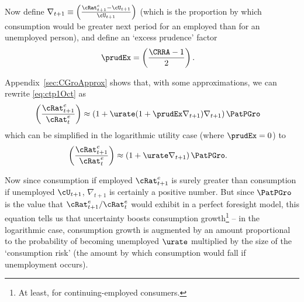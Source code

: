 \documentclass{\handout}
\begin{document}


Now define $\nabla _{t+1} \equiv
\left(\frac{{\cRat}^{e}_{t+1}-\cU_{t+1}}{\cU_{t+1}}\right)$ (which is
the proportion by which consumption would
be greater next period for an employed than for an 
unemployed person), and define an `excess prudence' factor
\begin{equation}\begin{gathered}\begin{aligned}
  \prudEx & =  \left(\frac{\CRRA-1}{2}\right).
\end{aligned}\end{gathered}\end{equation}

Appendix~\ref{sec:CGroApprox} shows that, with some approximations, we can rewrite \eqref{eq:ctp1Oct} as
\begin{equation}\begin{gathered}\begin{aligned}
         \left(\frac{{\cRat}^{e}_{t+1}}{{\cRat}^{e}_{t}}\right) & \approx  \left(1+ \urate (1+\prudEx\nabla _{t+1})\nabla _{t+1}\right) {\PatPGro}
         \label{eq:cedelapprox}
\end{aligned}\end{gathered}\end{equation}
which can be simplified in the logarithmic utility case (where $\prudEx = 0$) to
\begin{equation}\begin{gathered}\begin{aligned}
         \left(\frac{{\cRat}^{e}_{t+1}}{{\cRat}^{e}_{t}}\right) & \approx  \left(1+ \urate \nabla _{t+1}\right) {\PatPGro} \label{eq:cedelapproxLog}. 
\end{aligned}\end{gathered}\end{equation}

Now since consumption if employed ${\cRat}^{e}_{t+1}$ is surely greater than consumption if unemployed $\cU_{t+1}$, $\nabla _{t+1}$ is certainly a positive number.  But since ${\PatPGro}$ is the value that ${\cRat}^{e}_{t+1}/{\cRat}^{e}_{t}$ would exhibit in a perfect foresight model, this equation tells us that uncertainty boosts consumption growth\footnote{At least, for continuing-employed consumers.} -- in the logarithmic case, consumption growth is augmented by an amount proportional to the probability of becoming unemployed $\urate$ multiplied by the size of the `consumption risk' (the amount by which consumption would fall if unemployment occurs).
\end{document}
